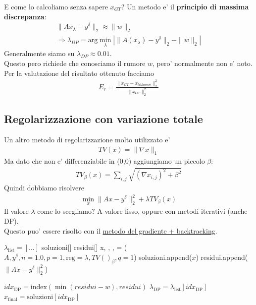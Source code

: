 \documentclass[a4paper,12pt]{article}
\begin{document}
E come lo calcoliamo senza sapere $x_{GT}$? Un metodo e' il \textbf{principio di massima discrepanza}:
\begin{align*}
    \| Ax_\lambda - y^\delta \|_2 \approx \|w\|_2 \\
    \Rightarrow \lambda_{DP} = \text{arg} \min_{\lambda} | \|A(x_\lambda) - y^\delta \|_2 - \|w\|_2  |
\end{align*}
Generalmente siamo su $\lambda_{DP} \approx 0.01$. \\
Questo pero richiede che conosciamo il rumore $w$, pero' normalmente non e' noto. \\
Per la valutazione del risultato ottenuto facciamo
\begin{align*}
    E_r = \frac{\| x_{GT} - x_{tikhonov} \|_2^2}{\| x_{GT} \|_2^2}
\end{align*}
\subsection*{Regolarizzazione con variazione totale}
Un altro metodo di regolarizzazione molto utilizzato e'
\begin{align*}
    TV(x) = \| \nabla x \|_1
\end{align*}
Ma dato che non e' differenziabile in (0,0) aggiungiamo un piccolo $\beta$:
\begin{align*}
    TV_\beta(x) = \sum_{i,j} \sqrt{ (\nabla x_{i,j})^2 + \beta^2 }
\end{align*}
Quindi dobbiamo risolvere 
\begin{align*}
    \min_x \| Ax - y^\delta \|_2^2 + \lambda TV_\beta (x)
\end{align*}
Il valore $\lambda$ come lo scegliamo? A valore fisso, oppure con metodi iterativi (anche DP). \\
Questo puo' essere risolto con il \hyperref[sec:met_grad]{metodo del gradiente + backtracking}. 
\begin{algorithm}[H]
\caption{TV + Discrepancy Principle con risoluzione via GD + regolarizzazione}
\begin{algorithmic}[1]
\State $\lambda_\text{list} = [\dots]$
\State soluzioni[]
\State residui[]
    \State x, , ,  = ($A,   y^\delta, n=1.0, p=1, \text{reg}=\lambda, TV()_\beta,q=1$)
    \State soluzioni.append($x$)
    \State residui.append($\|A x - y^\delta\|_2^2$)
\EndFor

\State ${idx}_\text{DP} = \text{index}(\min(residui - w), residui)$
\State $\lambda_{\text{DP}} = \lambda_{\text{list}}[idx_{\text{DP}}]$
\State $x_{\text{final}} = \text{soluzioni}[idx_{\text{DP}}]$

\end{algorithmic}
\end{algorithm}
\end{document}
